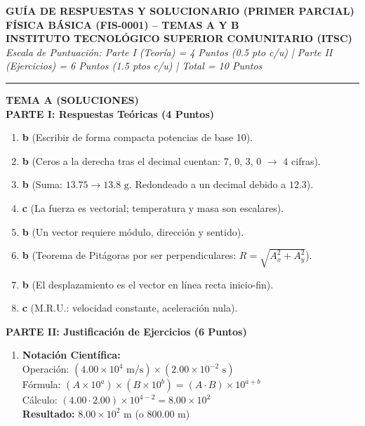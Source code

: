 \documentclass[9pt]{article}
\begin{document}
\begin{center}
    \textbf{\large GUÍA DE RESPUESTAS Y SOLUCIONARIO (PRIMER PARCIAL)} \\
    \textbf{FÍSICA BÁSICA (FIS-0001) -- TEMAS A Y B} \\
    \textbf{INSTITUTO TECNOLÓGICO SUPERIOR COMUNITARIO (ITSC)} \\
    \textit{Escala de Puntuación: Parte I (Teoría) = 4 Puntos (0.5 pto c/u) | Parte II (Ejercicios) = 6 Puntos (1.5 ptos c/u) | Total = 10 Puntos}
\end{center}

\vspace{0.1cm}
\hrule
\vspace{0.2cm}

\noindent
\begin{minipage}[t]{0.48\textwidth}
    \centering \textbf{\large TEMA A (SOLUCIONES)} \\
    \vspace{0.2cm}
    \flushleft
    \textbf{PARTE I: Respuestas Teóricas (4 Puntos)}
    \begin{enumerate}
        \item \textbf{b} (Escribir de forma compacta potencias de base 10).
        \item \textbf{b} (Ceros a la derecha tras el decimal cuentan: 7, 0, 3, 0 $\rightarrow$ 4 cifras).
        \item \textbf{b} (Suma: $13.75 \rightarrow 13.8\text{ g}$. Redondeado a un decimal debido a $12.3$).
        \item \textbf{c} (La fuerza es vectorial; temperatura y masa son escalares).
        \item \textbf{b} (Un vector requiere módulo, dirección y sentido).
        \item \textbf{b} (Teorema de Pitágoras por ser perpendiculares: $R = \sqrt{A_x^2 + A_y^2}$).
        \item \textbf{b} (El desplazamiento es el vector en línea recta inicio-fin).
        \item \textbf{c} (M.R.U.: velocidad constante, aceleración nula).
    \end{enumerate}

    \vspace{0.2cm}
    \textbf{PARTE II: Justificación de Ejercicios (6 Puntos)}
    \begin{enumerate}
        \item \textbf{Notación Científica:} \\
        Operación: $(4.00 \times 10^4\text{ m/s}) \times (2.00 \times 10^{-2}\text{ s})$ \\
        Fórmula: $(A \times 10^a) \times (B \times 10^b) = (A \cdot B) \times 10^{a+b}$ \\
        Cálculo: $(4.00 \cdot 2.00) \times 10^{4 - 2} = 8.00 \times 10^2$ \\
        \textbf{Resultado: } $8.00 \times 10^2\text{ m}$ (o $800.00\text{ m}$)
        

\end{enumerate}
\end{minipage}
\end{document}
